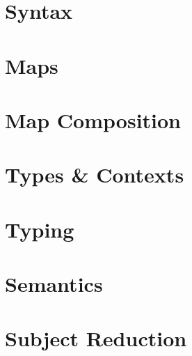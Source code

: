 \documentclass[sigplan,10pt]{acmart}
\begin{document}
  \section{Syntax}
  \KVariables
  \KModeTy
  \KTerms
  \FMode
  \FSyntax
  \FTerms

  \section{Maps}
  \KKit
  \KMap
  \KAp
  \KExt
  \KLift
  \KId
  \KSingle
  \KWeaken
  \KEq
  \KFunExt
  \KIdLift
  \KKitNotation
  \KTraversal
  \KKitInstances
  \KKitOpen
  \FTraversalOp
  \FTraversalId
  \FTraversalIdProofInteresting
  \FTraversal

  \section{Map Composition}
  \KWkKit
  \KWkKitInstances
  \KComposeKit
  \KComposition
  \KComposeKitAp
  \KDistLiftCompose
  \KComposeKitNotation
  \KComposeTraversal
  \KCommLiftWeaken
  \KCommLiftWeakenTraverse
  \KComposeKitInstances
  \KComposeKitInstancesConcrete
  \KWeakenCancelsSingle
  \KWeakenCancelsSingleTraverse
  \KDistLiftSingle
  \KDistLiftSingleTraverse
  \FAssoc
  \FAssocProofInteresting
  \FComposeTraversal

  \section{Types \& Contexts}
  \KTypeModes
  \KTypes
  \KContextHelper
  \KContexts
  \KContextLookup
  \FTypes

  \section{Typing}
  \KVariableTyping
  \KTyping
  \KTypingKit
  \KMapTyping
  \KLiftTyping
  \KSingleTyping
  \KTypingNotation
  \KTypingTraversal
  \KTypingInstances
  \FTyping
  \FTypingInst
  \FPreserve
  \FTypingTraversal

  \section{Semantics}
  \FValues
  \FReduction

  \section{Subject Reduction}
  \FSubjectReduction
  \FSubjectReductionProofInteresting

  

  \clearpage
  \appendix
\end{document}
